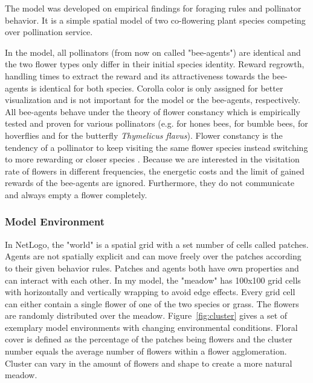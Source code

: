 The model was developed on empirical findings for foraging rules and pollinator behavior.  It is a simple spatial model of two co-flowering plant species competing over pollination service. 

In the model, all pollinators (from now on called "bee-agents") are identical and the two flower types only differ in their initial species identity. Reward regrowth, handling times to extract the reward and its attractiveness towards the bee-agents is identical for both species. Corolla color is only assigned for better visualization and is not important for the model or the bee-agents, respectively. All bee-agents behave under the theory of flower constancy which is empirically tested and proven for various pollinators (e.g. \citet{hill1997spontaneous} for hones bees, \citet{chittka1997foraging} for bumble bees, \citet{goulson1998flower} for hoverflies and \citet{goulson1997foraging} for the butterfly \textit{Thymelicus flavus}). Flower constancy is the tendency of a pollinator to keep visiting the same flower species instead switching to more rewarding or closer species \citep{chittka1999flower,waser1986flower}. Because we are interested in the visitation rate of flowers in different frequencies, the energetic costs and the limit of gained rewards of the bee-agents are ignored. Furthermore, they do not communicate and always empty a flower completely. 


\subsubsection*{Model Environment}

In NetLogo, the "world" is a spatial grid with a set number of cells called patches. Agents are not spatially explicit and can move freely over the patches according to their given behavior rules. Patches and agents both have own properties and can interact with each other. 
In my model, the "meadow" has 100x100 grid cells with horizontally and vertically wrapping to avoid edge effects. Every grid cell can either contain a single flower of one of the two species or grass. The flowers are randomly distributed over the meadow. 
Figure~\ref{fig:cluster} gives a set of exemplary model environments with changing environmental conditions. Floral cover is defined as the percentage of the patches being flowers and the cluster number equals the average number of flowers within a flower agglomeration. Cluster can vary in the amount of flowers and shape to create a more natural meadow.


